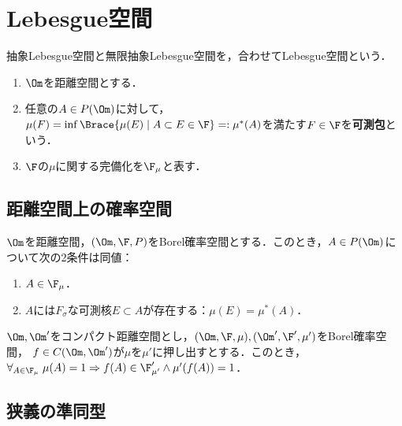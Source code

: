 \documentclass[uplatex,dvipdfmx]{jsreport}
\begin{document}
\section{Lebesgue空間}

\begin{tcolorbox}[colframe=ForestGreen, colback=ForestGreen!10!white,breakable,colbacktitle=ForestGreen!40!white,coltitle=black,fonttitle=\bfseries\sffamily,
title=]
    抽象Lebesgue空間と無限抽象Lebesgue空間を，合わせてLebesgue空間という．
\end{tcolorbox}

\begin{notation}\mbox{}
    \begin{enumerate}
        \item $\Om$を距離空間とする．
        \item 任意の$A\in P(\Om)$に対して，$\mu(F)=\inf\Brace{\mu(E)\mid A\subset E\in\F}=:\mu^*(A)$を満たす$F\in\F$を\textbf{可測包}という．
        \item $\F$の$\mu$に関する完備化を$\F_\mu$と表す．
    \end{enumerate}
\end{notation}

\subsection{距離空間上の確率空間}

\begin{proposition}[距離空間上の完備確率空間の性質]
    $\Om$を距離空間，$(\Om,\F,P)$をBorel確率空間とする．このとき，$A\in P(\Om)$について次の2条件は同値：
    \begin{enumerate}
        \item $A\in\F_\mu$．
        \item $A$には$F_\sigma$な可測核$E\subset A$が存在する：$\mu(E)=\mu^*(A)$．
    \end{enumerate}
\end{proposition}
\begin{proposition}[押し出しは充満集合を保つ]
    $\Om,\Om'$をコンパクト距離空間とし，$(\Om,\F,\mu),(\Om',\F',\mu')$をBorel確率空間，
    $f\in C(\Om,\Om')$が$\mu$を$\mu'$に押し出すとする．このとき，$\forall_{A\in\F_\mu}\;\mu(A)=1\Rightarrow f(A)\in\F'_{\mu'}\land \mu'(f(A))=1$．
\end{proposition}

\subsection{狭義の準同型}
\end{document}

